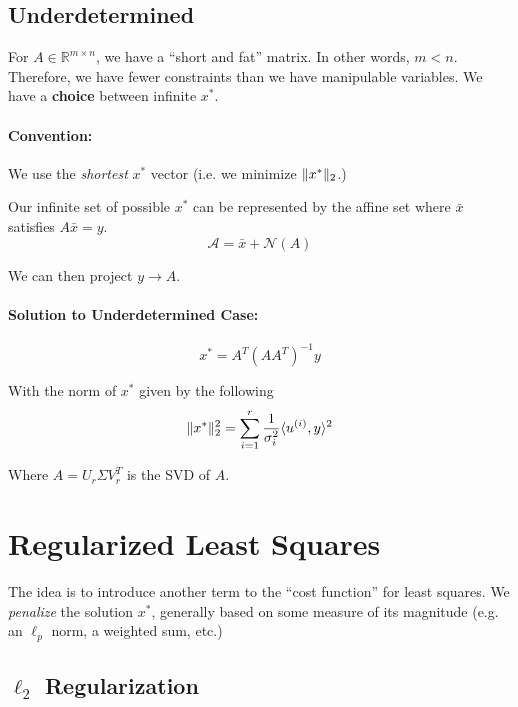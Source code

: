 \documentclass[a4paper,12pt]{report}
\DeclarePairedDelimiter\norm{\lVert}{\rVert}%
\DeclarePairedDelimiter\inpr{\langle}{\rangle}%
\begin{document}
\subsection{Underdetermined}

For $A\in \mathbb{R}^{m\times n}$, we have a ``short and fat'' matrix. In other words, $m < n$. Therefore, we have fewer constraints than we have manipulable variables. We have a \textbf{choice} between infinite $x^*$. 

\paragraph{Convention:} We use the \textit{shortest} $x^*$ vector (i.e. we minimize $\norm{x^*}_2$.)

Our infinite set of possible $x^*$ can be represented by the affine set where $\bar x$ satisfies $A\bar x = y$.
\begin{equation}
\mathcal{A} = \bar x + \mathcal{N}(A)
\end{equation}

We can then project $y\to A$.

\paragraph{Solution to Underdetermined Case: } 
\begin{equation}
x^* = A^T(AA^T)^{-1} y
\end{equation}

With the norm of $x^*$ given by the following
\begin{equation}
\norm{x^*}_2^2 = \sum_{i=1}^{r} \frac{1}{\sigma_i^2} \inpr{u^{(i)}, y}^2
\end{equation}

Where $A = U_r \Sigma V_r^T$ is the SVD of $A$. 

\section{Regularized Least Squares}

The idea is to introduce another term to the ``cost function'' for least squares. We \textit{penalize} the solution $x^*$, generally based on some measure of its magnitude (e.g. an $\ell_p$ norm, a weighted sum, etc.) 

\subsection{$\ell_2$ Regularization}
\end{document}

